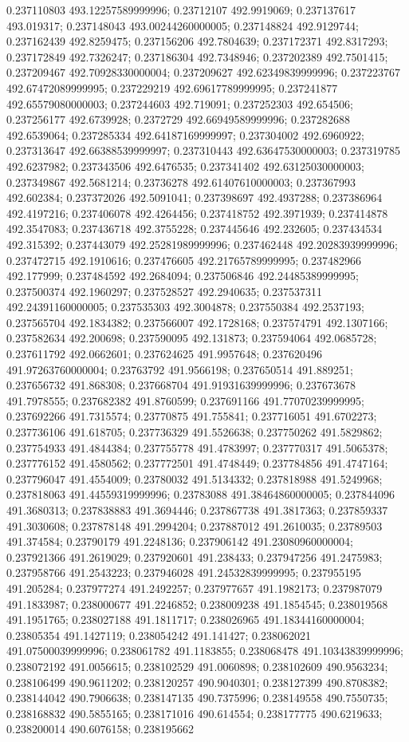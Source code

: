 0.237110803 493.12257589999996; 0.23712107 492.9919069; 0.237137617 493.019317; 0.237148043 493.00244260000005; 0.237148824 492.9129744; 0.237162439 492.8259475; 0.237156206 492.7804639; 0.237172371 492.8317293; 0.237172849 492.7326247; 0.237186304 492.7348946; 0.237202389 492.7501415; 0.237209467 492.70928330000004; 0.237209627 492.62349839999996; 0.237223767 492.67472089999995; 0.237229219 492.69617789999995; 0.237241877 492.65579080000003; 0.237244603 492.719091; 0.237252303 492.654506; 0.237256177 492.6739928; 0.2372729 492.66949589999996; 0.237282688 492.6539064; 0.237285334 492.64187169999997; 0.237304002 492.6960922; 0.237313647 492.66388539999997; 0.237310443 492.63647530000003; 0.237319785 492.6237982; 0.237343506 492.6476535; 0.237341402 492.63125030000003; 0.237349867 492.5681214; 0.23736278 492.61407610000003; 0.237367993 492.602384; 0.237372026 492.5091041; 0.237398697 492.4937288; 0.237386964 492.4197216; 0.237406078 492.4264456; 0.237418752 492.3971939; 0.237414878 492.3547083; 0.237436718 492.3755228; 0.237445646 492.232605; 0.237434534 492.315392; 0.237443079 492.25281989999996; 0.237462448 492.20283939999996; 0.237472715 492.1910616; 0.237476605 492.21765789999995; 0.237482966 492.177999; 0.237484592 492.2684094; 0.237506846 492.24485389999995; 0.237500374 492.1960297; 0.237528527 492.2940635; 0.237537311 492.24391160000005; 0.237535303 492.3004878; 0.237550384 492.2537193; 0.237565704 492.1834382; 0.237566007 492.1728168; 0.237574791 492.1307166; 0.237582634 492.200698; 0.237590095 492.131873; 0.237594064 492.0685728; 0.237611792 492.0662601; 0.237624625 491.9957648; 0.237620496 491.97263760000004; 0.23763792 491.9566198; 0.237650514 491.889251; 0.237656732 491.868308; 0.237668704 491.91931639999996; 0.237673678 491.7978555; 0.237682382 491.8760599; 0.237691166 491.77070239999995; 0.237692266 491.7315574; 0.23770875 491.755841; 0.237716051 491.6702273; 0.237736106 491.618705; 0.237736329 491.5526638; 0.237750262 491.5829862; 0.237754933 491.4844384; 0.237755778 491.4783997; 0.237770317 491.5065378; 0.237776152 491.4580562; 0.237772501 491.4748449; 0.237784856 491.4747164; 0.237796047 491.4554009; 0.23780032 491.5134332; 0.237818988 491.5249968; 0.237818063 491.44559319999996; 0.23783088 491.38464860000005; 0.237844096 491.3680313; 0.237838883 491.3694446; 0.237867738 491.3817363; 0.237859337 491.3030608; 0.237878148 491.2994204; 0.237887012 491.2610035; 0.23789503 491.374584; 0.23790179 491.2248136; 0.237906142 491.23080960000004; 0.237921366 491.2619029; 0.237920601 491.238433; 0.237947256 491.2475983; 0.237958766 491.2543223; 0.237946028 491.24532839999995; 0.237955195 491.205284; 0.237977274 491.2492257; 0.237977657 491.1982173; 0.237987079 491.1833987; 0.238000677 491.2246852; 0.238009238 491.1854545; 0.238019568 491.1951765; 0.238027188 491.1811717; 0.238026965 491.18344160000004; 0.23805354 491.1427119; 0.238054242 491.141427; 0.238062021 491.07500039999996; 0.238061782 491.1183855; 0.238068478 491.10343839999996; 0.238072192 491.0056615; 0.238102529 491.0060898; 0.238102609 490.9563234; 0.238106499 490.9611202; 0.238120257 490.9040301; 0.238127399 490.8708382; 0.238144042 490.7906638; 0.238147135 490.7375996; 0.238149558 490.7550735; 0.238168832 490.5855165; 0.238171016 490.614554; 0.238177775 490.6219633; 0.238200014 490.6076158; 0.238195662 
